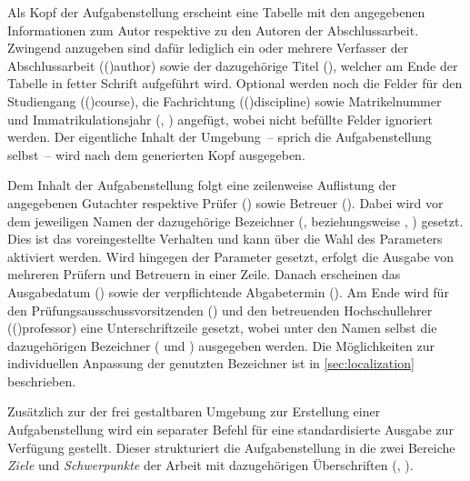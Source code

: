 \begin{DeclareEntity}{}
\begin{Declaration}
\begin{Declaration}
\begin{Declaration}
Als Kopf der Aufgabenstellung erscheint eine Tabelle mit den angegebenen 
Informationen zum Autor respektive zu den Autoren der Abschlussarbeit. Zwingend 
anzugeben sind dafür lediglich ein oder mehrere Verfasser der Abschlussarbeit 
(\Macro(){author}) sowie der dazugehörige Titel (), 
welcher am Ende der Tabelle in fetter Schrift aufgeführt wird. Optional werden 
noch die Felder für den Studiengang (\Macro(){course}), die 
Fachrichtung (\Macro(){discipline}) sowie Matrikelnummer und 
Immatrikulationsjahr (, ) 
angefügt, wobei nicht befüllte Felder ignoriert werden. Der eigentliche Inhalt 
der Umgebung~-- sprich die Aufgabenstellung selbst~-- wird nach dem generierten 
Kopf ausgegeben.

Dem Inhalt der Aufgabenstellung folgt eine zeilenweise Auflistung der 
angegebenen Gutachter respektive Prüfer () sowie Betreuer 
(). Dabei wird vor dem jeweiligen Namen der dazugehörige 
Bezeichner (,  beziehungsweise 
, ) gesetzt. 
Dies ist das voreingestellte Verhalten und kann über die Wahl des Parameters
%
 aktiviert werden. Wird hingegen der Parameter 
 gesetzt, erfolgt die Ausgabe von mehreren 
Prüfern und Betreuern in einer Zeile. Danach erscheinen das Ausgabedatum 
() sowie der verpflichtende Abgabetermin (). Am 
Ende wird für den Prüfungsausschussvorsitzenden () und den 
betreuenden Hochschullehrer (\Macro(){professor}) eine 
Unterschriftzeile gesetzt, wobei unter den Namen selbst die dazugehörigen 
Bezeichner ( und ) ausgegeben werden. 
Die Möglichkeiten zur individuellen Anpassung der genutzten Bezeichner ist in 
\autoref{sec:localization} beschrieben. 
\end{Declaration}
\end{Declaration}
\end{Declaration}

\begin{Declaration}
  {}
\printdeclarationlist

Zusätzlich zur der frei gestaltbaren Umgebung  zur Erstellung
einer Aufgabenstellung wird ein separater Befehl für eine standardisierte 
Ausgabe zur Verfügung gestellt. Dieser strukturiert die Aufgabenstellung in die 
zwei Bereiche \emph{Ziele} und \emph{Schwerpunkte} der Arbeit mit dazugehörigen 
Überschriften (, ).


\end{Declaration}
\end{DeclareEntity}
